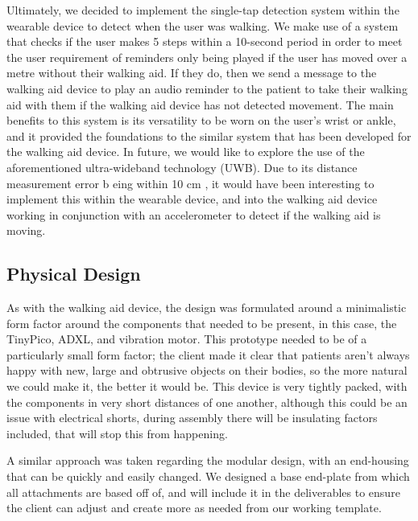           Ultimately, we decided to implement the single-tap detection system within the wearable device to detect when the user was walking. We make use of a system that checks if the user makes 5 steps within a 10-second period in order to meet the user requirement of reminders only being played if the user has moved over a metre without their walking aid. If they do, then we send a message to the walking aid device to play an audio reminder to the patient to take their walking aid with them if the walking aid device has not detected movement. The main benefits to this system is its versatility to be worn on the user's wrist or ankle, and it provided the foundations to the similar system that has been developed for the walking aid device. In future, we would like to explore the use of the aforementioned ultra-wideband technology (UWB). Due to its distance measurement error b
           eing within 10 cm \cite{uwb_accuracy}, it would have been interesting to implement this within the wearable device, and into the walking aid device working in conjunction with an accelerometer to detect if the walking aid is moving.

        \subsection{Physical Design}
        \label{subsec:Design_Decisions_wearable}
            As with the walking aid device, the design was formulated around a minimalistic form factor around the components that needed to be present, in this case, the TinyPico, ADXL, and vibration motor. This prototype needed to be of a particularly small form factor; the client made it clear that patients aren't always happy with new, large and obtrusive objects on their bodies, so the more natural we could make it, the better it would be. This device is very tightly packed, with the components in very short distances of one another, although this could be an issue with electrical shorts, during assembly there will be insulating factors included, that will stop this from happening.


            A similar approach was taken regarding the modular design, with an end-housing that can be quickly and easily changed. We designed a base end-plate from which all attachments are based off of, and will include it in the deliverables to ensure the client can adjust and create more as needed from our working template.

